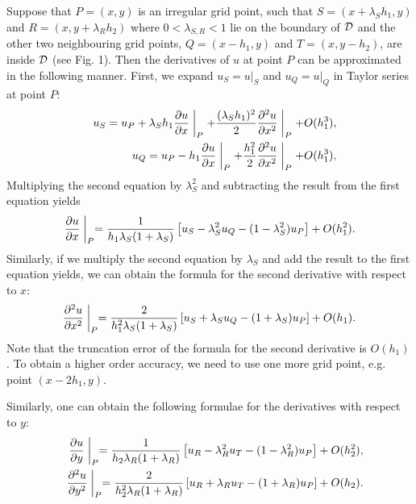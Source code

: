 \vskip 0.3cm   Suppose that $P=(x,y)$ is an irregular grid
point, such that $S=(x+\lambda_{S}h_{1},y)$ and
$R=(x,y+\lambda_{R}h_{2})$ where $0<\lambda_{S,R}<1$ lie on the
boundary of ${\cal D}$ and the other two neighbouring grid points,
$Q=(x-h_{1},y)$ and $T=(x,y-h_{2})$, are inside ${\cal D}$ (see
Fig. 1). Then the derivatives of $u$ at point $P$ can be
approximated in the following manner. First, we expand
$u_{S}=u\vert_{S}$ and $u_{Q}=u\vert_{Q}$ in Taylor series at
point $P$:
\begin{eqnarray}
&&u_{S}=u_{P}+\lambda_{S}h_{1}\frac{{\partial} u}{{\partial} x}\biggm\vert_{P}+
\frac{(\lambda_{S}h_{1})^2}{2}\frac{{\partial}^2 u}{{\partial} x^2}\biggm\vert_{P}+O(h_{1}^3), \nonumber \\
&&u_{Q}=u_{P}-h_{1}\frac{{\partial} u}{{\partial} x}\biggm\vert_{P}+
\frac{h_{1}^2}{2}\frac{{\partial}^2 u}{{\partial}
x^2}\biggm\vert_{P}+O(h_{1}^3),  \nonumber
\end{eqnarray}
Multiplying the second equation by $\lambda_{S}^2$ and subtracting
the result from the first equation yields
\[
\frac{{\partial} u}{{\partial}
x}\biggm\vert_{P}=\frac{1}{h_{1}\lambda_{S}(1+\lambda_{S})} \left[
u_{S}-\lambda_{S}^2
u_{Q}-(1-\lambda_{S}^2)u_{P}\right]+O(h_{1}^2).
\]
Similarly, if we multiply the second equation by $\lambda_{S}$ and
add the result to the first equation yields, we can obtain the
formula for the second derivative with respect to $x$:
\[
\frac{{\partial}^2 u}{{\partial}
x^2}\biggm\vert_{P}=\frac{2}{h_{1}^2\lambda_{S}(1+\lambda_{S})}
\left[ u_{S}+\lambda_{S}
u_{Q}-(1+\lambda_{S})u_{P}\right]+O(h_{1}).
\]
Note that the truncation error of the formula for the second
derivative is $O(h_{1})$. To obtain a higher order accuracy, we
need to use one more grid point, e.g. point $(x-2h_1,y)$.

\vskip 0.3cm   Similarly, one can obtain the following
formulae for the derivatives with respect to $y$:
\begin{eqnarray}
&&\frac{{\partial} u}{{\partial}
y}\biggm\vert_{P}=\frac{1}{h_{2}\lambda_{R}(1+\lambda_{R})}
\left[ u_{R}-\lambda_{R}^2 u_{T}-(1-\lambda_{R}^2)u_{P}\right]+O(h_{2}^2), \nonumber \\
&&\frac{{\partial}^2 u}{{\partial}
y^2}\biggm\vert_{P}=\frac{2}{h_{2}^2\lambda_{R}(1+\lambda_{R})}
\left[ u_{R}+\lambda_{R}
u_{T}-(1+\lambda_{R})u_{P}\right]+O(h_{2}). \nonumber
\end{eqnarray}

